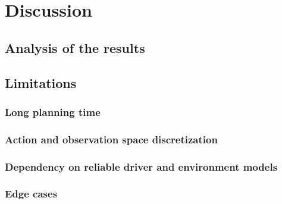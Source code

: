 \chapter{Discussion}
\label{sec:discussion}

\section{Analysis of the results}

\section{Limitations}
\subsection{Long planning time}
\subsection{Action and observation space discretization}
\subsection{Dependency on reliable driver and environment models}
\subsection{Edge cases}